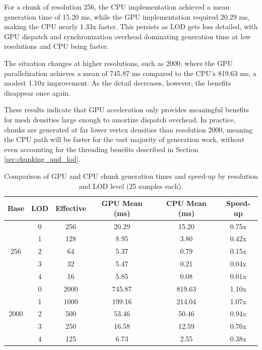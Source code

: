 For a chunk of resolution 256, the CPU implementation achieved a mean generation time of 15.20 ms, while the GPU implementation required 20.29 ms, making the CPU nearly 1.33x faster.
This persists as LOD gets less detailed, with GPU dispatch and synchronization overhead dominating generation time at low resolutions and CPU being faster.

The situation changes at higher resolutions, such as 2000, where the GPU parallelization achieves a mean of 745.87 ms compared to the CPU's 819.63 ms, a modest 1.10x improvement.
As the detail decreases, however, the benefits disappear once again.

These results indicate that GPU acceleration only provides meaningful benefits 
for mesh densities large enough to amortize dispatch overhead. In practice, 
chunks are generated at far lower vertex densities than resolution 2000, meaning the 
CPU path will be faster for the vast majority of generation work, without even 
accounting for the threading benefits described in Section \ref{sec:chunking_and_lod}.

\begin{table}[H]
\centering
\begin{tabular}{cccccc}
\toprule
\small\textbf{Base} & \small\textbf{LOD} & \small\textbf{Effective} & \small\textbf{GPU Mean (ms)} & \small\textbf{CPU Mean (ms)} & \small\textbf{Speed-up} \\
\midrule
\multirow{5}{*}{256}  & 0 & 256 & 20.29 & 15.20 & 0.75x \\
                      & 1 & 128 &  8.95 &  3.80 & 0.42x \\
                      & 2 &  64 &  5.37 &  0.79 & 0.15x \\
                      & 3 &  32 &  5.47 &  0.21 & 0.04x \\
                      & 4 &  16 &  5.85 &  0.08 & 0.01x \\
\midrule
\multirow{5}{*}{2000} & 0 & 2000 & 745.87 & 819.63 & 1.10x \\
                      & 1 & 1000 & 199.16 & 214.04 & 1.07x \\
                      & 2 &  500 &  53.46 &  50.46 & 0.94x \\
                      & 3 &  250 &  16.58 &  12.59 & 0.76x \\
                      & 4 &  125 &   6.73 &   2.55 & 0.38x \\
\bottomrule
\end{tabular}
\caption{Comparison of GPU and CPU chunk generation times and speed-up by resolution and LOD level (25 samples each).}
\label{tab:gpu_cpu_chunk_comparison}
\end{table}

